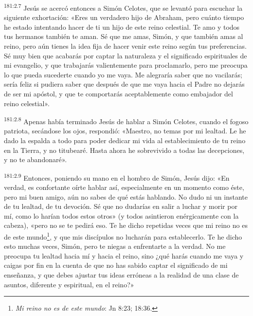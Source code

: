 \par
\textsuperscript{181:2.7} Jesús se acercó entonces a Simón Celotes, que se levantó para escuchar la siguiente exhortación: «Eres un verdadero hijo de Abraham, pero cuánto tiempo he estado intentando hacer de ti un hijo de este reino celestial. Te amo y todos tus hermanos también te aman. Sé que me amas, Simón, y que también amas al reino, pero aún tienes la idea fija de hacer venir este reino según tus preferencias. Sé muy bien que acabarás por captar la naturaleza y el significado espirituales de mi evangelio, y que trabajarás valientemente para proclamarlo, pero me preocupa lo que pueda sucederte cuando yo me vaya. Me alegraría saber que no vacilarás; sería feliz si pudiera saber que después de que me vaya hacia el Padre no dejarás de ser mi apóstol, y que te comportarás aceptablemente como embajador del reino celestial».

\par
\textsuperscript{181:2.8} Apenas había terminado Jesús de hablar a Simón Celotes, cuando el fogoso patriota, secándose los ojos, respondió: «Maestro, no temas por mi lealtad. Le he dado la espalda a todo para poder dedicar mi vida al establecimiento de tu reino en la Tierra, y no titubearé. Hasta ahora he sobrevivido a todas las decepciones, y no te abandonaré».

\par
\textsuperscript{181:2.9} Entonces, poniendo su mano en el hombro de Simón, Jesús dijo: «En verdad, es confortante oírte hablar así, especialmente en un momento como éste, pero mi buen amigo, aún no sabes de qué estás hablando. No dudo ni un instante de tu lealtad, de tu devoción. Sé que no dudarías en salir a luchar y morir por mí, como lo harían todos estos otros» (y todos asintieron enérgicamente con la cabeza), «pero no se te pedirá eso. Te he dicho repetidas veces que mi reino no es de este mundo\footnote{\textit{Mi reino no es de este mundo}: Jn 8:23; 18:36.}, y que mis discípulos no lucharán para establecerlo. Te he dicho esto muchas veces, Simón, pero te niegas a enfrentarte a la verdad. No me preocupa tu lealtad hacia mí y hacia el reino, sino ¿qué harás cuando me vaya y caigas por fin en la cuenta de que no has sabido captar el significado de mi enseñanza, y que debes ajustar tus ideas erróneas a la realidad de una clase de asuntos, diferente y espiritual, en el reino?»

